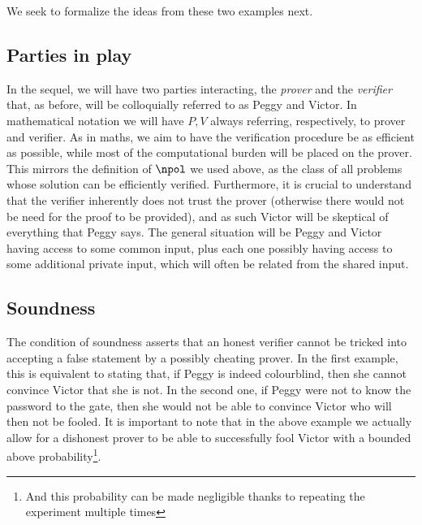 \documentclass{article}
\begin{document}
We seek to formalize the ideas from these two examples next.

\subsection{Parties in play}
In the sequel, we will have two parties interacting, the \textit{prover} and the \textit{verifier} that, as before, will be colloquially referred to as Peggy and Victor. In mathematical notation we will have $P, V$ always referring, respectively, to prover and verifier. As in maths, we aim to have the verification procedure be as efficient as possible, while most of the computational burden will be placed on the prover. This mirrors the definition of $\npol$ we used above, as the class of all problems whose solution can be efficiently verified. Furthermore, it is crucial to understand that the verifier inherently does not trust the prover (otherwise there would not be need for the proof to be provided), and as such Victor will be skeptical of everything that Peggy says. The general situation will be Peggy and Victor having access to some common input, plus each one possibly having access to some additional private input, which will often be related from the shared input.

\subsection{Soundness}
The condition of soundness asserts that an honest verifier cannot be tricked into accepting a false statement by a possibly cheating prover. In the first example, this is equivalent to stating that, if Peggy is indeed colourblind, then she cannot convince Victor that she is not. In the second one, if Peggy were not to know the password to the gate, then she would not be able to convince Victor who will then not be fooled. It is important to note that in the above example we actually allow for a dishonest prover to be able to successfully fool Victor with a bounded above probability\footnote{And this probability can be made negligible thanks to repeating the experiment multiple times}.
\end{document}
